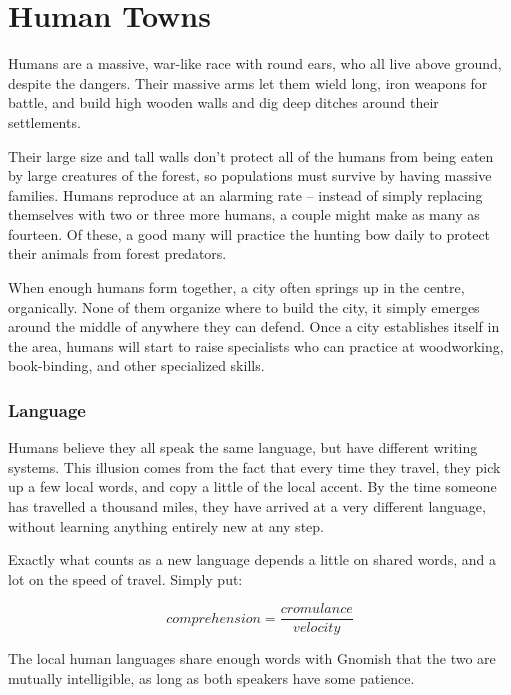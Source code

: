\section[Humans]{Human Towns \Hu}
\label{humanTowns}

\begin{multicols}{2}
\renewcommand\npcsymbol{\Hu}


\noindent
Humans are a massive, war-like race with round ears, who all live above ground, despite the dangers.
Their massive arms let them wield long, iron weapons for battle, and build high wooden walls and dig deep ditches around their settlements.

Their large size and tall walls don't protect all of the humans from being eaten by large creatures of the forest, so populations must survive by having massive families.
Humans reproduce at an alarming rate -- instead of simply replacing themselves with two or three more humans, a couple might make as many as fourteen.
Of these, a good many will practice the hunting bow daily to protect their animals from forest predators.

When enough humans form together, a city often springs up in the centre, organically.
None of them organize where to build the city, it simply emerges around the middle of anywhere they can defend.
Once a city establishes itself in the area, humans will start to raise specialists who can practice at woodworking, book-binding, and other specialized skills.

\subsubsection{Language}

Humans believe they all speak the same language, but have different writing systems.
This illusion comes from the fact that every time they travel, they pick up a few local words, and copy a little of the local accent.
By the time someone has travelled a thousand miles, they have arrived at a very different language, without learning anything entirely new at any step.

Exactly what counts as a new language depends a little on shared words, and a lot on the speed of travel.
Simply put:

$$ comprehension = \frac{cromulance}{velocity} $$

The local human languages share enough words with Gnomish that the two are mutually intelligible, as long as both speakers have some patience.


\end{multicols}
